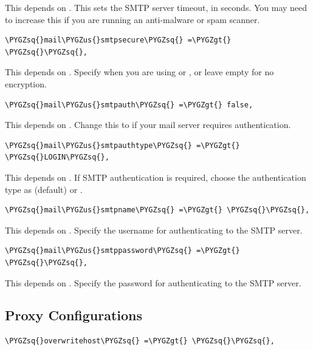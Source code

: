 \documentclass[letterpaper,10pt,english]{sphinxmanual}
\def\PYGZus{\char`\_}
\def\PYGZgt{\char`\>}
\def\PYGZsq{\char`\'}
\begin{document}
This depends on . This sets the SMTP server timeout, in
seconds. You may need to increase this if you are running an anti-malware or
spam scanner.

\begin{Verbatim}[commandchars=\\\{\}]
\PYGZsq{}mail\PYGZus{}smtpsecure\PYGZsq{} =\PYGZgt{} \PYGZsq{}\PYGZsq{},
\end{Verbatim}

This depends on . Specify when you are using  or
, or leave empty for no encryption.

\begin{Verbatim}[commandchars=\\\{\}]
\PYGZsq{}mail\PYGZus{}smtpauth\PYGZsq{} =\PYGZgt{} false,
\end{Verbatim}

This depends on . Change this to  if your mail
server requires authentication.

\begin{Verbatim}[commandchars=\\\{\}]
\PYGZsq{}mail\PYGZus{}smtpauthtype\PYGZsq{} =\PYGZgt{} \PYGZsq{}LOGIN\PYGZsq{},
\end{Verbatim}

This depends on . If SMTP authentication is required, choose
the authentication type as  (default) or .

\begin{Verbatim}[commandchars=\\\{\}]
\PYGZsq{}mail\PYGZus{}smtpname\PYGZsq{} =\PYGZgt{} \PYGZsq{}\PYGZsq{},
\end{Verbatim}

This depends on . Specify the username for authenticating to
the SMTP server.

\begin{Verbatim}[commandchars=\\\{\}]
\PYGZsq{}mail\PYGZus{}smtppassword\PYGZsq{} =\PYGZgt{} \PYGZsq{}\PYGZsq{},
\end{Verbatim}

This depends on . Specify the password for authenticating to
the SMTP server.


\subsection{Proxy Configurations}
\label{configuration_server/config_sample_php_parameters:proxy-configurations}
\begin{Verbatim}[commandchars=\\\{\}]
\PYGZsq{}overwritehost\PYGZsq{} =\PYGZgt{} \PYGZsq{}\PYGZsq{},
\end{Verbatim}
\end{document}
